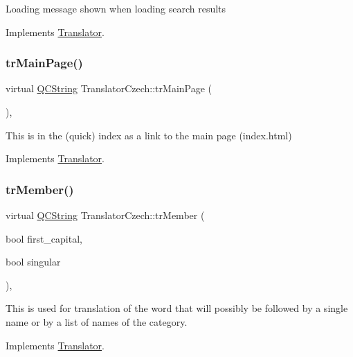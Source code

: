 Loading message shown when loading search results 

Implements \mbox{\hyperlink{class_translator}{Translator}}.

\mbox{\label{class_translator_czech_aefbb45a259a2466aeaece52e794df102}} 
\subsubsection{\texorpdfstring{trMainPage()}{trMainPage()}}
{\footnotesize\ttfamily virtual \mbox{\hyperlink{class_q_c_string}{Q\+C\+String}} Translator\+Czech\+::tr\+Main\+Page (\begin{DoxyParamCaption}{ }\end{DoxyParamCaption})\hspace{0.3cm}{\ttfamily [inline]}, {\ttfamily [virtual]}}

This is in the (quick) index as a link to the main page (index.\+html) 

Implements \mbox{\hyperlink{class_translator}{Translator}}.

\mbox{\label{class_translator_czech_a2d61740da3fefe1d80fe78835555bce5}} 
\subsubsection{\texorpdfstring{trMember()}{trMember()}}
{\footnotesize\ttfamily virtual \mbox{\hyperlink{class_q_c_string}{Q\+C\+String}} Translator\+Czech\+::tr\+Member (\begin{DoxyParamCaption}\item[{bool}]{first\+\_\+capital,  }\item[{bool}]{singular }\end{DoxyParamCaption})\hspace{0.3cm}{\ttfamily [inline]}, {\ttfamily [virtual]}}

This is used for translation of the word that will possibly be followed by a single name or by a list of names of the category. 

Implements \mbox{\hyperlink{class_translator}{Translator}}.

\mbox{\label{class_translator_czech_a6b347ea533bfa4ba4b42f97cd6491af9}} 

